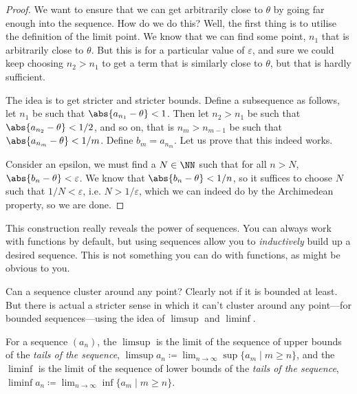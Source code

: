 \begin{proof}
	We want to ensure that we can get arbitrarily close to $\theta$ by going
	far enough into the sequence. How do we do this? Well, the first thing is to
	utilise the definition of the limit point. We know that we can find some point, $n_1$
	that is arbitrarily close to $\theta$. But this is for a particular value of $\varepsilon$, and sure
	we could keep choosing $n_2 > n_1$ to get a term that is similarly close to $\theta$,
	but that is hardly sufficient.

	The idea is to get stricter and stricter bounds. Define a subsequence as follows, let $n_1$
	be such that $\abs{a_{n_1} - \theta} < 1$. Then let $n_2 > n_1$ be such that
	$\abs{a_{n_2} - \theta} < {1}/{2}$, and so on, that is $n_{m} > n_{m-1}$ be such that
	$\abs{a_{n_m} - \theta} < {1}/{m}$. Define $b_m = a_{n_m}$. Let us prove that this
	indeed works.

	Consider an epsilon, we must find a $N \in \NN$ such that for all $n > N$,
	$\abs{b_n - \theta} < \varepsilon$. We know that $\abs{b_n - \theta} < {1}/{n}$, so it
	suffices to choose $N$ such that ${1}/{N} < \varepsilon$, i.e. $N > {1}/{\varepsilon}$,
	which we can indeed do by the Archimedean property, so we are done.
\end{proof}

\begin{remark}
	This construction really reveals the power of sequences. You can always work with
	functions by default, but using sequences allow you to \emph{inductively} build up
	a desired sequence. This is not something you can do with functions, as might be
	obvious to you.
\end{remark}

Can a sequence cluster around any point? Clearly not if it is bounded at least. But
there is actual a stricter sense in which it can't cluster around any point---for bounded sequences---using the idea of $\limsup$ and $\liminf$.

\begin{definition}
	For a sequence $(a_n)$, the $\limsup$ is the limit of the sequence of upper bounds of
	the \emph{tails of the sequence},
	$\limsup a_n \coloneq \lim_{n \to \infty} \sup \{a_m \mid m \geq n\}$, and the $\liminf$ is the limit of the sequence of lower bounds of
	the \emph{tails of the sequence},
	$\liminf a_n \coloneq \lim_{n \to \infty} \inf \{a_m \mid m \geq n\}$.
\end{definition}

